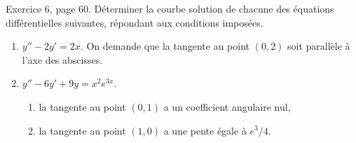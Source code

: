 \begin{exercice}\label{exoEquaDiff0013}

Exercice 6, page 60. Déterminer la courbe solution de chacune des équations différentielles suivantes, répondant aux conditions imposées.
\begin{enumerate}

\item
$y''-2y'=2x$. On demande que la tangente au point $(0,2)$ soit parallèle à l'axe des abscisses.

\item
$y''-6y'+9y=x^2 e^{3x}$.
\begin{enumerate}

\item
la tangente au point $(0,1)$ a un coefficient angulaire nul,
\item
la tangente au point $(1,0)$ a une pente égale à $e^3/4$.

\end{enumerate}

\end{enumerate}

\end{exercice}

